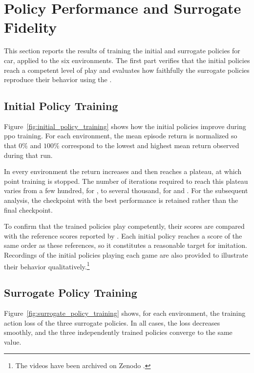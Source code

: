 \section{Policy Performance and Surrogate Fidelity}
\label{sec:experiments_policy_performance_and_surrogate_fidelity}

This section reports the results of training the initial and surrogate policies for \gls{car}, applied to the six environments.
The first part verifies that the initial policies reach a competent level of play and evaluates how faithfully the surrogate policies reproduce their behavior using the \BehaviorReconstructionName.

\subsection{Initial Policy Training}
\label{ssec:initial_policy_training}



Figure~\ref{fig:initial_policy_training} shows how the initial policies improve during \gls{ppo} training.
For each environment, the mean episode return is normalized so that $0\%$ and $100\%$ correspond to the lowest and highest mean return observed during that run.

In every environment the return increases and then reaches a plateau, at which point training is stopped.
The number of iterations required to reach this plateau varies from a few hundred, for \PongName, to several thousand, for \SurroundName and \MsPacManName.
For the subsequent analysis, the checkpoint with the best performance is retained rather than the final checkpoint.

To confirm that the trained policies play competently, their scores are compared with the reference scores reported by \parencite{machado2017revisitingarcadelearningenvironment}.
Each initial policy reaches a score of the same order as these references, so it constitutes a reasonable target for imitation.
Recordings of the initial policies playing each game are also provided to illustrate their behavior qualitatively.\footnote{The videos have been archived on Zenodo \LinkPolicyVideos.}

\subsection{Surrogate Policy Training}
\label{ssec:surrogate_policy_training}

Figure~\ref{fig:surrogate_policy_training} shows, for each environment, the training action loss of the three surrogate policies.
In all cases, the loss decreases smoothly, and the three independently trained policies converge to the same value.

